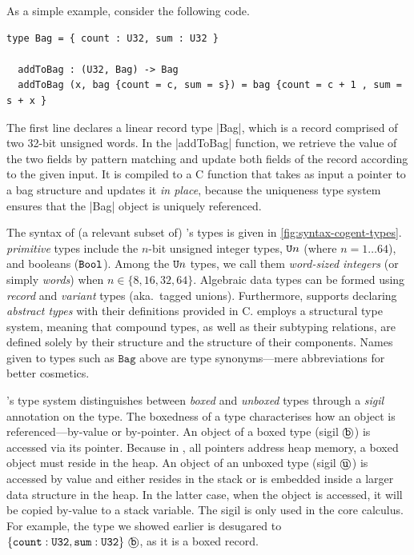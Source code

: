 As a simple \cogent example, consider the following code.
\begin{lstlisting}[language=Cogent]
  type Bag = { count : U32, sum : U32 }
  
  addToBag : (U32, Bag) -> Bag
  addToBag (x, bag {count = c, sum = s}) = bag {count = c + 1 , sum = s + x }
\end{lstlisting}
The first line declares a linear record type \cg|Bag|, which is a record
comprised of two 32-bit unsigned words. In the \cg|addToBag| function,
we retrieve the value of the two fields by pattern matching and 
update both fields of the record according to the given input.
It is compiled to a C function that takes as input a pointer to a bag
structure and updates it \emph{in place}, because the uniqueness type 
system ensures that the \cg|Bag| object is uniquely referenced.



The syntax of (a relevant subset of) \cogent's types is given in \autoref{fig:syntax-cogent-types}.
\cogent \emph{primitive} types include the $n$-bit unsigned integer
types, $\texttt{U}n$ (where $n = 1 \dots 64$), and booleans ($\texttt{Bool}$).
Among the $\texttt{U}n$ types, we call them \emph{word-sized integers} (or simply
\emph{words}) when $n \in \{8,16,32,64\}$. Algebraic data types can be formed using
\emph{record} and \emph{variant} types (aka.\ tagged unions).
%
Furthermore, \cogent supports declaring \emph{abstract types} with their
definitions provided in C.
%
\cogent employs a structural type system, meaning that compound types, as well as their subtyping
relations, are defined solely by their structure and the structure of their components. Names given to types such as $\mathtt{Bag}$ above are type synonyms---mere abbreviations for better cosmetics. 


\cogent's type system distinguishes between \emph{boxed} and
\emph{unboxed} types through a \emph{sigil} annotation on the type.
The boxedness of a type characterises how an object is referenced---by-value or by-pointer.
An object of a boxed type (sigil $\text{\textcircled{\texttt{b}}}$) is accessed via its pointer.
Because in \cogent, all pointers address heap memory, a boxed object must reside in the heap.
An object of an unboxed type (sigil $\text{\textcircled{\texttt{u}}}$) is accessed by value and either
resides in the stack or is embedded inside a larger data structure in the
heap. In the latter case, when the object is accessed, it will be copied
by-value to a stack variable. The sigil is only used in the \cogent core calculus.
For example, the type  we showed earlier is desugared to $\{ 
  \texttt{count} : \texttt{U32}, \texttt{sum} : \texttt{U32} \}\ \text{\textcircled{\texttt{b}}}$, as it is 
a boxed record.

